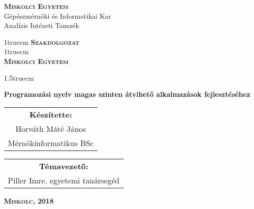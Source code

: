 \pagestyle{empty} %

\begin{flushleft}
\textsc{\bfseries Miskolci Egyetem}\\
Gépészmérnöki és Informatikai Kar\\
Analízis Intézeti Tanszék
\end{flushleft}

{\large
\begin{center}
\vglue 1truecm
\textbf{\huge\textsc{Szakdolgozat}}\\
\vglue 1truecm
\\
\textbf{\textsc{Miskolci Egyetem}}
\end{center}}

\vglue 1.5truecm %

{\LARGE
\begin{center}
\textbf{Programozási nyelv magas szinten átvihető alkalmazások fejlesztéséhez}
\end{center}}

\vspace*{2.5truecm}
{\large
\begin{center}
\begin{tabular}{c}
\textbf{Készítette:}\\
Horváth Máté János\\
Mérnökinformatikus BSc
\end{tabular}
\end{center}
\begin{center}
\begin{tabular}{c}
\textbf{Témavezető:}\\
Piller Imre, egyetemi tanársegéd
\end{tabular}
\end{center}}
\vfill
{\large
\begin{center}
\textbf{\textsc{Miskolc, 2018}}
\end{center}}

\newpage
